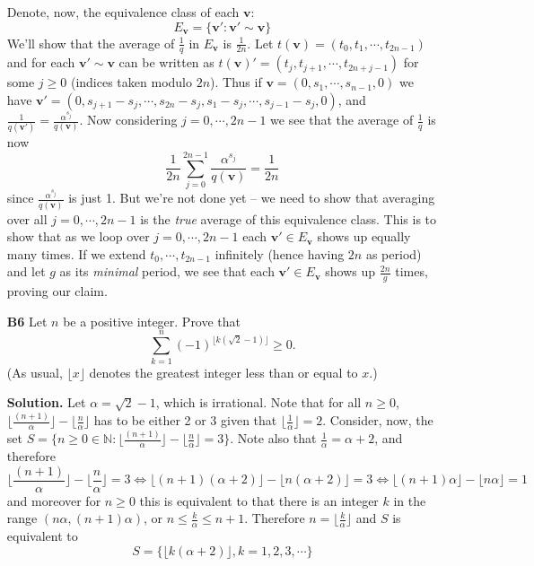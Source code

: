 \documentclass[11pt,a4paper]{article}
\newcommand{\<}{\langle}
\renewcommand{\>}{\rangle}
\begin{document}
\begin{enumerate}
	Denote, now, the equivalence class of each $\mathbf{v}$: 
	\[
	E_{\mathbf{v}} = \{\mathbf{v}': \mathbf{v'}\sim \mathbf{v}\}
	\]
	We'll show that the average of $\frac{1}{q}$ in $E_{\mathbf{v}}$ is $\frac{1}{2n}$. 
	Let $t(\mathbf{v})=(t_0,t_1,\cdots,t_{2n-1})$ and for each $\mathbf{v}'\sim\mathbf{v}$ can be written as 
	$t(\mathbf{v})'=(t_j,t_{j+1},\cdots,t_{2n+j-1})$ for some $j\ge 0$ (indices taken modulo $2n$). 
	Thus if $\mathbf{v}=(0, s_1, \cdots, s_{n-1}, 0)$ we have 
	$\mathbf{v}'=(0, s_{j+1}-s_j, \cdots, s_{2n}-s_j, s_1-s_j, \cdots, s_{j-1}-s_j, 0)$, 
	and $\frac{1}{q(\mathbf{v}')}=\frac{\alpha^{s_j}}{q(\mathbf{v})}$. 
	Now considering $j=0, \cdots, 2n-1$ we see that the average of $\frac{1}{q}$ is now 
	\[
	\frac{1}{2n}\sum_{j=0}^{2n-1}\frac{\alpha^{s_j}}{q(\mathbf{v})} = \frac{1}{2n}
	\]
	since $\frac{\alpha^{s_j}}{q(\mathbf{v})}$ is just 1. 
	But we're not done yet -- we need to show that averaging over all $j=0, \cdots, 2n-1$ is the \emph{true} average of this equivalence class. 
	This is to show that as we loop over $j=0, \cdots, 2n-1$ each $\mathbf{v}'\in E_{\mathbf{v}}$ shows up equally many times. 
	If we extend $t_0, \cdots, t_{2n-1}$ infinitely (hence having $2n$ as period) and let $g$ as its \emph{minimal} period, we see that each $\mathbf{v}'\in E_{\mathbf{v}}$ shows up $\frac{2n}{g}$ times, 
	proving our claim. 
	
	\item[\textbf{B6}] Let $n$ be a positive integer. Prove that
	$$\sum_{k=1}^n (-1)^{\lfloor k (\sqrt{2} - 1) \rfloor} \geq 0.$$(As usual, $\lfloor x \rfloor$ denotes the greatest integer less than or equal to $x$.)
	
	\textbf{Solution.} Let $\alpha = \sqrt{2} - 1$, which is irrational. 
	Note that for all $n\ge 0$, $\lfloor \frac{(n+1)}{\alpha}\rfloor - \lfloor \frac{n}{\alpha}\rfloor$ has to be either 2 or 3 given that 
	$\lfloor \frac{1}{\alpha}\rfloor = 2$. 
	Consider, now, the set $S = \{n\ge 0\in \mathbb{N}: \lfloor \frac{(n+1)}{\alpha}\rfloor - \lfloor \frac{n}{\alpha}\rfloor = 3\}$. 
	Note also that $\frac{1}{\alpha} = \alpha+2$, and therefore 
	\[
	\lfloor \frac{(n+1)}{\alpha}\rfloor - \lfloor \frac{n}{\alpha}\rfloor = 3
	\Leftrightarrow 
	\lfloor (n+1)(\alpha + 2)\rfloor - \lfloor n(\alpha + 2)\rfloor = 3
	\Leftrightarrow 
	 \lfloor (n+1)\alpha\rfloor - \lfloor n\alpha\rfloor = 1
	\]
	and moreover for $n\ge 0$ this is equivalent to that there is an integer $k$ in the range $(n\alpha, (n+1)\alpha)$, 
	or $n\le \frac{k}{\alpha}\le n + 1$. 
	Therefore $n = \lfloor \frac{k}{\alpha}\rfloor$ and $S$ is equivalent to 
	\[
	S = \{\lfloor k(\alpha + 2)\rfloor, k = 1, 2, 3, \cdots\}
	\]
	

\end{enumerate}
\end{document}
